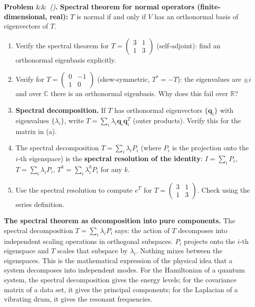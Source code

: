 \documentclass[12pt,a4paper]{article}
\newcounter{problem}
\newenvironment{problem}[1][]{\refstepcounter{problem}\par\vspace{6pt}\noindent\textbf{\color{MidBlue}Problem \theproblem}\ifx&#1&\else\ \textit{(#1)}\fi\textbf{.}\enskip}{\par\vspace{4pt}}
\begin{document}
\begin{problem}
\label{prob:spectral_full}
\textbf{Spectral theorem for normal operators (finite-dimensional, real):}
$T$ is normal if and only if $V$ has an orthonormal basis of eigenvectors of $T$.

\begin{enumerate}[label=(\alph*),topsep=2pt]
  \item Verify the spectral theorem for $T = \begin{pmatrix}3&1\\1&3\end{pmatrix}$ (self-adjoint): find an orthonormal eigenbasis explicitly.
  \item Verify for $T = \begin{pmatrix}0&-1\\1&0\end{pmatrix}$ (skew-symmetric, $T^*=-T$): the eigenvalues are $\pm i$ and over $\mathbb{C}$ there is an orthonormal eigenbasis. Why does this fail over $\mathbb{R}$?
  \item \textbf{Spectral decomposition.} If $T$ has orthonormal eigenvectors $\{\mathbf{q}_i\}$ with eigenvalues $\{\lambda_i\}$, write $T = \sum_i\lambda_i\mathbf{q}_i\mathbf{q}_i^T$ (outer products). Verify this for the matrix in (a).
  \item The spectral decomposition $T = \sum_i\lambda_i P_i$ (where $P_i$ is the projection onto the $i$-th eigenspace) is the \textbf{spectral resolution of the identity}: $I = \sum_i P_i$, $T = \sum_i\lambda_i P_i$, $T^k = \sum_i\lambda_i^k P_i$ for any $k$.
  \item Use the spectral resolution to compute $e^T$ for $T = \begin{pmatrix}3&1\\1&3\end{pmatrix}$. Check using the series definition.
\end{enumerate}
\end{problem}

\begin{thought}
\textbf{The spectral theorem as decomposition into pure components.}
The spectral decomposition $T = \sum_i\lambda_i P_i$ says: the action of $T$ decomposes into independent scaling operations in orthogonal subspaces. $P_i$ projects onto the $i$-th eigenspace and $T$ scales that subspace by $\lambda_i$. Nothing mixes between the eigenspaces. This is the mathematical expression of the physical idea that a system decomposes into independent modes. For the Hamiltonian of a quantum system, the spectral decomposition gives the energy levels; for the covariance matrix of a data set, it gives the principal components; for the Laplacian of a vibrating drum, it gives the resonant frequencies.
\end{thought}
\end{document}
